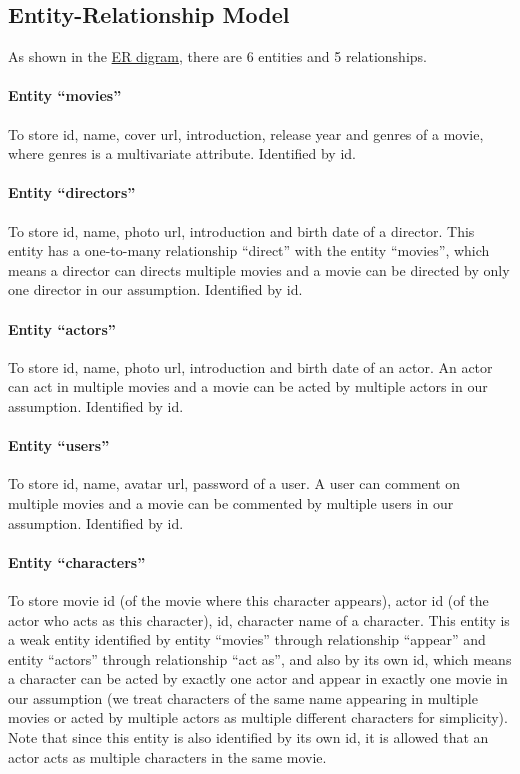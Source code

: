 \begin{CJK*}{UTF8}{gbsn}
\subsection{Entity-Relationship Model}
As shown in the \hyperref[ERD]{ER digram}, there are 6 entities and 5 relationships. 
\paragraph{Entity ``movies''}
To store id, name, cover url, introduction, release year and genres of a movie, where genres is a multivariate attribute. Identified by id. 
\paragraph{Entity ``directors''}
To store id, name, photo url, introduction and birth date of a director. This entity has a one-to-many relationship ``direct'' with the entity ``movies'', which means a director can directs multiple movies and a movie can be directed by only one director in our assumption. Identified by id. 
\paragraph{Entity ``actors''}
To store id, name, photo url, introduction and birth date of an actor. An actor can act in multiple movies and a movie can be acted by multiple actors in our assumption. Identified by id. 
\paragraph{Entity ``users''}
To store id, name, avatar url, password of a user. A user can comment on multiple movies and a movie can be commented by multiple users in our assumption. Identified by id. 
\paragraph{Entity ``characters''}
To store movie id (of the movie where this character appears), actor id (of the actor who acts as this character), id, character name of a character. This entity is a weak entity identified by entity ``movies'' through relationship ``appear'' and entity ``actors'' through relationship ``act as'', and also by its own id, which means a character can be acted by exactly one actor and appear in exactly one movie in our assumption (we treat characters of the same name appearing in multiple movies or acted by multiple actors as multiple different characters for simplicity). Note that since this entity is also identified by its own id, it is allowed that an actor acts as multiple characters in the same movie. 

\end{CJK*}
